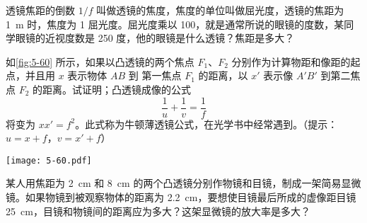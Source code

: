 \begin{Exercise}
\begin{question}
  \item 透镜焦距的倒数 $1/f$ 叫做透镜的焦度，焦度的单位叫做屈光度，透镜的焦距为 \qty{1}{m} 时，焦度为 1 屈光度。屈光度乘以 100，就是通常所说的眼镜的度数，某同学眼镜的近视度数是 250 度，他的眼镜是什么透镜？焦距是多大？
  \item 如\cref{fig:5-60} 所示，如果以凸透镜的两个焦点 $F_1$、$F_2$ 分别作为计算物距和像距的起点，并且用 $x$ 表示物体 $AB$ 到 第一焦点 $F_1$ 的距离，以 $x'$ 表示像 $A'B'$ 到第二焦点 $F_2$ 的距离。试证明；凸透镜成像的公式
  \[\frac{1}{u}+\frac{1}{v}=\frac{1}{f} \]
  将变为 $xx'=f^2$。此式称为牛顿薄透镜公式，在光学书中经常遇到。（提示：$u=x+f$，$v=x'+f$）
  \begin{figurehere}
    \begin{minipage}{\linewidth}\centering
      \texttt{[image: 5-60.pdf]}
      \caption{}\label{fig:5-60}
    \end{minipage}
  \end{figurehere}
  \item 某人用焦距为 \qty{2}{cm} 和 \qty{8}{cm} 的两个凸透镜分别作物镜和目镜，制成一架简易显微镜。如果物镜到被观察物体的距离为 \qty{2.2}{cm}，要想使目镜最后所成的虚像距目镜 \qty{25}{cm}，目镜和物镜间的距离应为多大？这架显微镜的放大率是多大？
\end{question}
\end{Exercise}
